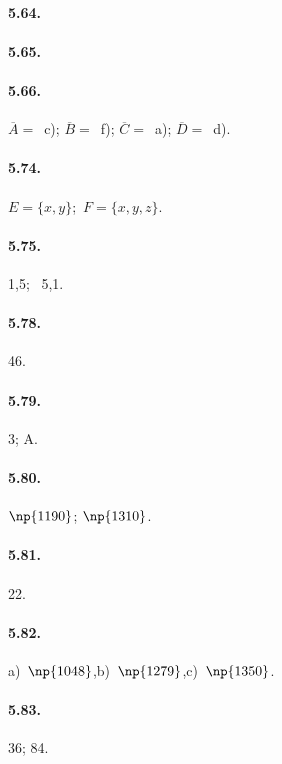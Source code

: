 \begin{multicols}{2}
\paragraph{5.64.} \boxD

\paragraph{5.65.} \boxB

\paragraph{5.66.} $\overline{A}=$~c); $\overline{B}=$~f); $\overline{C}=$~a); $\overline{D}=$~d).

\paragraph{5.74.} $E=\{x,y\}$;~$F=\{x,y,z\}$.

\paragraph{5.75.} 1,5;~ 5,1.

\paragraph{5.78.} 46.

\paragraph{5.79.} 3; A.

\paragraph{5.80.} $\np{1190}$; $\np{1310}$.

\paragraph{5.81.} 22.

\paragraph{5.82.} a)~$\np{1048}$,\quad b)~$\np{1279}$,\quad c)~$\np{1350}$.

\paragraph{5.83.} 36; 84.


\end{multicols}
